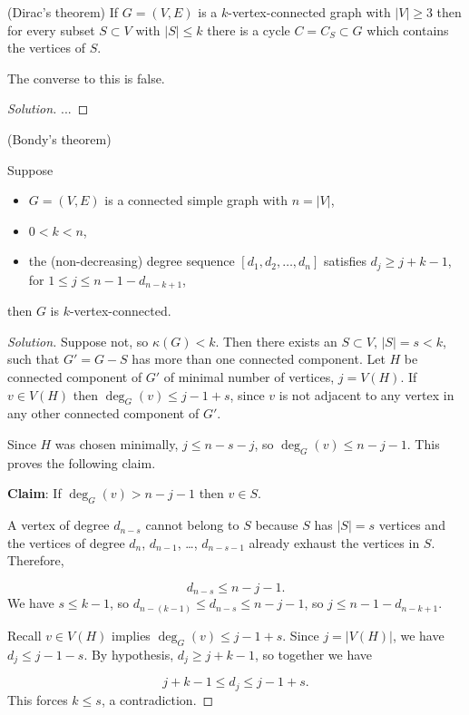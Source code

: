 \begin{theorem}
(Dirac's theorem)
{\rm
If $G=(V,E)$ is a $k$-vertex-connected graph with
$|V|\geq 3$ then for every subset $S\subset V$ with
$|S|\leq k$ there is a cycle $C=C_S\subset G$ which contains
the vertices of $S$.
}
\end{theorem}

The converse to this is false.

\begin{proof}[Solution]
...
\end{proof}


\begin{theorem}
(Bondy's theorem)
{\rm
Suppose

\begin{itemize}
\item
$G=(V,E)$ is a connected simple graph with $n=|V|$,
\item
$0<k<n$,
\item
the (non-decreasing) degree sequence
$[d_1,d_2,\dots, d_n]$ satisfies
$d_j\geq j+k-1$, for $1\leq j\leq n-1-d_{n-k+1}$,
\end{itemize}
then $G$ is $k$-vertex-connected.
}
\end{theorem}

\begin{proof}[Solution]
Suppose not, so $\kappa(G)<k$. Then there exists an
$S\subset V$, $|S|=s<k$, such that $G'=G-S$ has more
than one connected component. Let $H$ be connected
component of $G'$ of minimal number of
vertices, $j=V(H)$. If $v\in V(H)$ then
$\deg_G(v)\leq j-1+s$, since $v$ is not adjacent to any
vertex in any other connected component of $G'$.

Since $H$ was chosen minimally, $j\leq n-s-j$, so
$\deg_G(v)\leq n-j-1$. This proves the following claim.

\noindent
{\bf Claim}: If $\deg_G(v) > n-j-1$ then $v\in S$.

A vertex of degree $d_{n-s}$ cannot belong to
$S$ because $S$ has $|S|=s$ vertices and the
vertices of degree $d_n$, $d_{n-1}$, \dots,
$d_{n-s-1}$ already exhaust the vertices in $S$. Therefore,

\[
d_{n-s}\leq n-j-1.
\]
We have $s\leq k-1$, so $d_{n-(k-1)}\leq d_{n-s}\leq n-j-1$,
so $j\leq n-1-d_{n-k+1}$.

Recall $v\in V(H)$ implies $\deg_G(v)\leq j-1+s$.
Since $j=|V(H)|$, we have
$d_j\leq j-1-s$.
By hypothesis, $d_j\geq j+k-1$, so together we have

\[
j+k-1\leq d_j \leq j-1+s.
\]
This forces $k\leq s$, a contradiction.
\end{proof}


